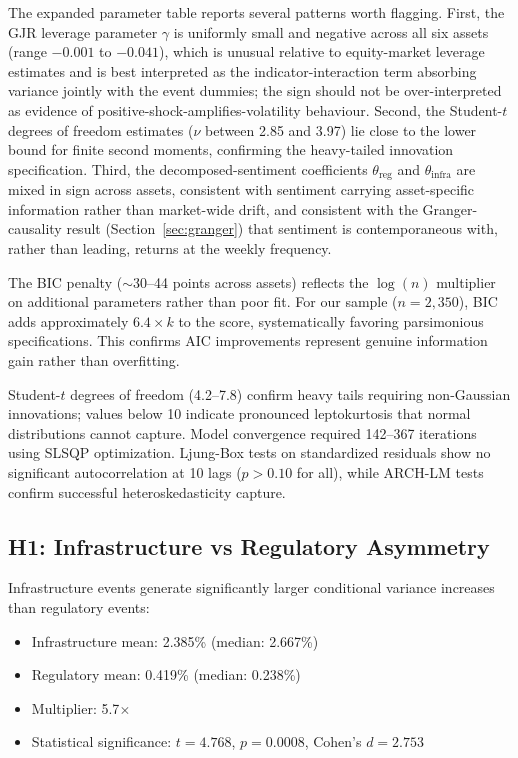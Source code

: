 \documentclass[pdflatex,sn-mathphys-num]{sn-jnl}
\theoremstyle{thmstyleone}
\theoremstyle{thmstyletwo}
\theoremstyle{thmstylethree}
\begin{document}
The expanded parameter table reports several patterns worth flagging. First, the GJR leverage parameter $\gamma$ is uniformly small and negative across all six assets (range $-0.001$ to $-0.041$), which is unusual relative to equity-market leverage estimates and is best interpreted as the indicator-interaction term absorbing variance jointly with the event dummies; the sign should not be over-interpreted as evidence of positive-shock-amplifies-volatility behaviour. Second, the Student-$t$ degrees of freedom estimates ($\nu$ between 2.85 and 3.97) lie close to the lower bound for finite second moments, confirming the heavy-tailed innovation specification. Third, the decomposed-sentiment coefficients $\theta_{\text{reg}}$ and $\theta_{\text{infra}}$ are mixed in sign across assets, consistent with sentiment carrying asset-specific information rather than market-wide drift, and consistent with the Granger-causality result (Section~\ref{sec:granger}) that sentiment is contemporaneous with, rather than leading, returns at the weekly frequency.

The BIC penalty ($\sim$30--44 points across assets) reflects the $\log(n)$ multiplier on additional parameters rather than poor fit. For our sample ($n=2,350$), BIC adds approximately $6.4 \times k$ to the score, systematically favoring parsimonious specifications. This confirms AIC improvements represent genuine information gain rather than overfitting.

Student-$t$ degrees of freedom (4.2--7.8) confirm heavy tails requiring non-Gaussian innovations; values below 10 indicate pronounced leptokurtosis that normal distributions cannot capture. Model convergence required 142--367 iterations using SLSQP optimization. Ljung-Box tests on standardized residuals show no significant autocorrelation at 10 lags ($p > 0.10$ for all), while ARCH-LM tests confirm successful heteroskedasticity capture.

\subsection{H1: Infrastructure vs Regulatory Asymmetry}

Infrastructure events generate significantly larger conditional variance increases than regulatory events:

\begin{itemize}[nosep]
\item Infrastructure mean: 2.385\% (median: 2.667\%)
\item Regulatory mean: 0.419\% (median: 0.238\%)
\item Multiplier: 5.7$\times$
\item Statistical significance: $t=4.768$, $p=0.0008$, Cohen's $d=2.753$
\end{itemize}
\end{document}
